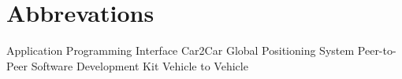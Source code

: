 \chapter*{Abbrevations}
\begin{acronym}[FHWN;-)]
 {Application Programming Interface}
 {Car2Car}
 {Global Positioning System}
 {Peer-to-Peer}
 {Software Development Kit}
 {Vehicle to Vehicle}
\end{acronym}
